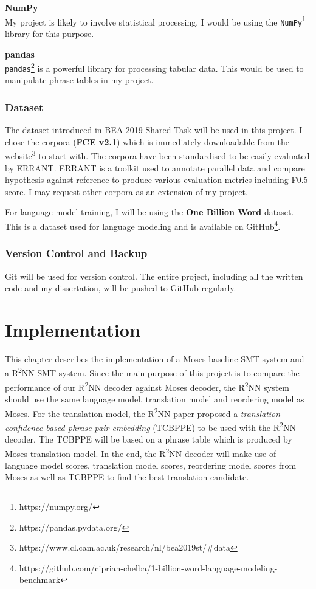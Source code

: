 \documentclass[12pt,a4paper,twoside,openright]{report}
\begin{document}
\textbf{NumPy} \\
My project is likely to involve statistical processing. I would be using the \texttt{NumPy}\footnote{https://numpy.org/} library for this purpose.

\textbf{pandas} \\
\texttt{pandas}\footnote{https://pandas.pydata.org/} is a powerful library for processing tabular data. This would be used to manipulate phrase tables in my project.

\subsection{Dataset}
The dataset introduced in BEA 2019 Shared Task\cite{bryant-etal-2019-bea} will be used in this project. I chose the corpora (\textbf{FCE v2.1}) which is immediately downloadable from the website\footnote{https://www.cl.cam.ac.uk/research/nl/bea2019st/\#data} to start with. The corpora have been standardised to be easily evaluated by ERRANT\cite{bryant-etal-2017-automatic,felice-etal-2016-automatic}. ERRANT is a toolkit used to annotate parallel data and compare hypothesis against reference to produce various evaluation metrics including F0.5 score. I may request other corpora as an extension of my project.

For language model training, I will be using the \textbf{One Billion Word} dataset\cite{one-billion-word}. This is a dataset used for language modeling and is available on GitHub\footnote{https://github.com/ciprian-chelba/1-billion-word-language-modeling-benchmark}.

\subsection{Version Control and Backup}
Git will be used for version control. The entire project, including all the written code and my dissertation, will be pushed to GitHub regularly.

\chapter{Implementation} \label{implementation}
This chapter describes the implementation of a Moses baseline SMT system and a R\textsuperscript{2}NN SMT system. Since the main purpose of this project is to compare the performance of our R\textsuperscript{2}NN decoder against Moses decoder, the R\textsuperscript{2}NN system should use the same language model, translation model and reordering model as Moses. For the translation model, the R\textsuperscript{2}NN paper\cite{r2nn} proposed a \textit{translation confidence based phrase pair embedding} (TCBPPE) to be used with the R\textsuperscript{2}NN decoder. The TCBPPE will be based on a phrase table which is produced by Moses translation model. In the end, the R\textsuperscript{2}NN decoder will make use of language model scores, translation model scores, reordering model scores from Moses as well as TCBPPE to find the best translation candidate.
\end{document}
